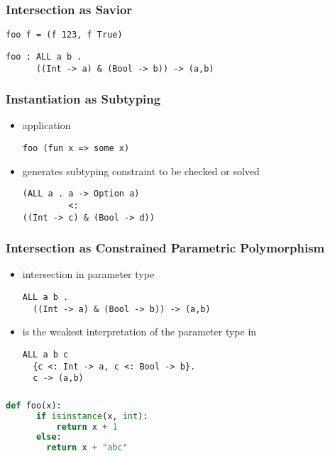 \documentclass{beamer}
\begin{document}
\begin{frame}[fragile]
  \frametitle{Intersection as Savior}

  \begin{lstlisting}
foo f = (f 123, f True)
  \end{lstlisting}

  \begin{lstlisting}
foo : ALL a b . 
      ((Int -> a) & (Bool -> b)) -> (a,b)
  \end{lstlisting}
\end{frame}


\begin{frame}[fragile]
  \frametitle{Instantiation as Subtyping}

  \begin{itemize}
  \item application 
  \begin{lstlisting}
foo (fun x => some x)
  \end{lstlisting}
  \item generates subtyping constraint to be checked or solved 
  \begin{lstlisting}
(ALL a . a -> Option a) 
         <: 
((Int -> c) & (Bool -> d))
  \end{lstlisting}
  \end{itemize}
\end{frame}


\begin{frame}[fragile]
  \frametitle{Intersection as Constrained Parametric Polymorphism}
  \begin{itemize}
  \item intersection in parameter type 
  \begin{lstlisting}
ALL a b . 
  ((Int -> a) & (Bool -> b)) -> (a,b)
  \end{lstlisting}
  \item is the weakest interpretation of the parameter type in 
  \begin{lstlisting}
ALL a b c 
  {c <: Int -> a, c <: Bool -> b}. 
  c -> (a,b)
  \end{lstlisting}
  \end{itemize}
\end{frame}






\begin{frame}[fragile]
  \frametitle{}

  \begin{lstlisting}[language=Python]
  def foo(x):
      if isinstance(x, int):
          return x + 1 
      else:
        return x + "abc"
  \end{lstlisting}
\end{frame}
\end{document}
